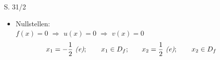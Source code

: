 \begin{Exercise}{S. 31/2}{}
\begin{enumerate}
\begin{enumerate}[label=\alph*)]
{\begin{itemize}[leftmargin=*]
{                        $\Rightarrow \quad \uuline{D_{f} = \left] \ -\dfrac{1}{2}\right] \quad \cup \quad \left[ \ \dfrac{1}{2}; \infty \ \right[}$
                        }\\[-1.0ex]
                    \item Nullstellen: \\[1.0ex]{
                        $f(x) = 0$ \qquad $\Rightarrow$ \qquad $u(x) = 0$ \qquad $\Rightarrow$ \qquad $v(x) = 0$\\[-2.0ex]
                        \begin{align*}
                            x_{1} = -\dfrac{1}{2} \ \text{\textit{(e)}}; \qquad x_{1} \in D_{f}; \quad & \quad x_{2} = \dfrac{1}{2} \ \text{\textit{(e)}}; \qquad x_{2} \in D_{f} && \\[-1.0ex]
                        \end{align*}
                        }
                \end{itemize}
                }
        \end{enumerate}
    \end{enumerate}
\end{Exercise}

